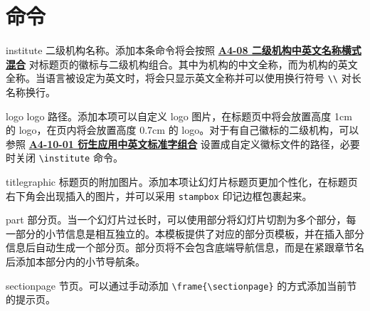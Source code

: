 \documentclass[a4paper,12pt]{article}
\begin{document}
\section{命令}

\begin{docCommand*}[]{institute}{}
    二级机构名称。添加本条命令将会按照 \href{https://vi.sjtu.edu.cn/index.php/articles/base/4}{\textbf{A4-08 二级机构中英文名称横式混合}} 对标题页的徽标与二级机构组合。其中为机构的中文全称，而为机构的英文全称。当语言被设定为英文时，将会只显示英文全称并可以使用换行符号 \verb"\\" 对长名称换行。
\end{docCommand*}

\begin{docCommand*}[]{logo}{}
    logo 路径。添加本项可以自定义 logo 图片，在标题页中将会放置高度 1cm 的 logo，在页内将会放置高度 0.7cm 的 logo。对于有自己徽标的二级机构，可以参照 \href{https://vi.sjtu.edu.cn/index.php/articles/base/4}{\textbf{A4-10-01 衍生应用中英文标准字组合}} 设置成自定义徽标文件的路径，必要时关闭 \verb"\institute" 命令。
\end{docCommand*}

\begin{docCommand*}[]{titlegraphic}{}
    标题页的附加图片。添加本项让幻灯片标题页更加个性化，在标题页右下角会出现插入的图片，并可以采用 \verb"stampbox" 印记边框包裹起来。
\end{docCommand*}

\begin{docCommand*}[]{part}{}
    部分页。当一个幻灯片过长时，可以使用部分将幻灯片切割为多个部分，每一部分的小节信息是相互独立的。本模板提供了对应的部分页模板，并在插入部分信息后自动生成一个部分页。部分页将不会包含底端导航信息，而是在紧跟章节名后添加本部分内的小节导航条。
\end{docCommand*}

\begin{docCommand*}[]{sectionpage}{}
    节页。可以通过手动添加 \verb"\frame{\sectionpage}" 的方式添加当前节的提示页。
\end{docCommand*}
\end{document}
